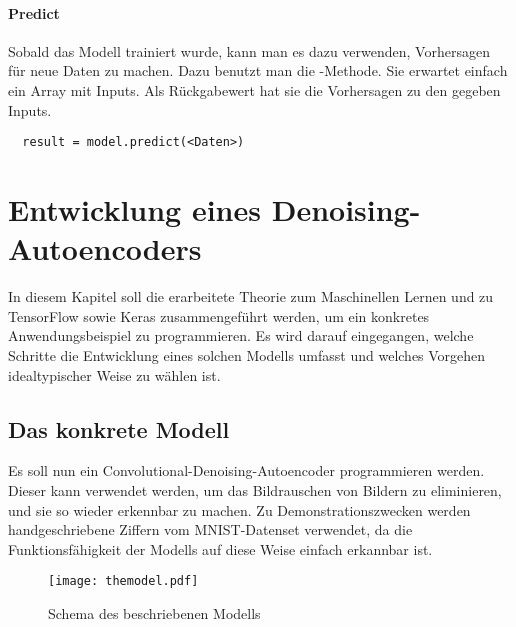 \subsubsection{Predict}
Sobald das Modell trainiert wurde, kann man es dazu verwenden, Vorhersagen für
neue Daten zu machen. Dazu benutzt man die -Methode. Sie erwartet
einfach ein Array mit Inputs. Als Rückgabewert hat sie die Vorhersagen zu den
gegeben Inputs.

\begin{verbatim}
  result = model.predict(<Daten>)
\end{verbatim}



\chapter{Entwicklung eines Denoising-Autoencoders}
In diesem Kapitel soll die erarbeitete Theorie zum Maschinellen Lernen und zu
TensorFlow sowie Keras zusammengeführt werden, um ein konkretes
Anwendungsbeispiel zu programmieren.
Es wird darauf eingegangen, welche Schritte die
Entwicklung eines solchen Modells umfasst und welches Vorgehen
idealtypischer Weise zu wählen ist.

\section{Das konkrete Modell}
Es soll nun ein Convolutional-Denoising-Autoencoder programmieren werden.
Dieser kann verwendet werden, um das Bildrauschen von Bildern zu eliminieren, und
sie so wieder erkennbar zu machen.
Zu Demonstrationszwecken werden handgeschriebene Ziffern vom MNIST-Datenset
verwendet, da die Funktionsfähigkeit der Modells auf diese Weise einfach
erkannbar ist.


\begin{figure}[h!]
  \centering
  \texttt{[image: themodel.pdf]}
  \caption{Schema des beschriebenen Modells}
\end{figure}

